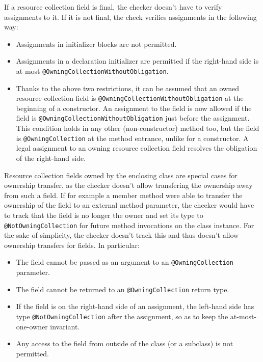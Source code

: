 If a resource collection field is final, the checker doesn't have to verify assignments to it. If it is not final, the check verifies assignments in the following way:
\begin{itemize}
  \item Assignments in initializer blocks are not permitted.
  \item Assignments in a declaration initializer are permitted if the right-hand side is at most \texttt{@OwningCollectionWithoutObligation}.
  \item Thanks to the above two restrictions, it can be assumed that an owned resource collection field is \texttt{@OwningCollectionWithoutObligation} at the beginning of a constructor. An assignment to the field is now allowed if the field is \texttt{@OwningCollectionWithoutObligation} just before the assignment. This condition holds in any other (non-constructor) method too, but the field is \texttt{@OwningCollection} at the method entrance, unlike for a constructor. A legal assignment to an owning resource collection field resolves the obligation of the right-hand side.
\end{itemize}

Resource collection fields owned by the enclosing class are special cases for ownership transfer, as the checker doesn't allow transfering the ownership away from such a field. If for example a member method were able to transfer the ownership of the field to an external method parameter, the checker would have to track that the field is no longer the owner and set its type to \texttt{@NotOwningCollection} for future method invocations on the class instance. For the sake of simplicity, the checker doesn't track this and thus doesn't allow ownership transfers for fields. In particular:

\begin{itemize}
  \item The field cannot be passed as an argument to an \texttt{@OwningCollection} parameter.
  \item The field cannot be returned to an \texttt{@OwningCollection} return type.
  \item If the field is on the right-hand side of an assignment, the left-hand side has type \texttt{@NotOwningCollection} after the assignment, so as to keep the at-most-one-owner invariant.
  \item Any access to the field from outside of the class (or a subclass) is not permitted.
\end{itemize}

